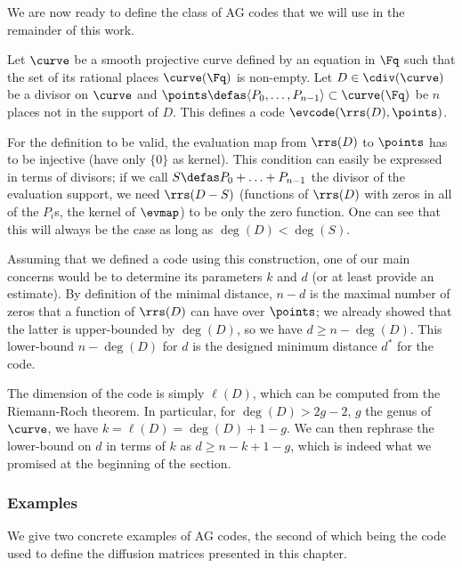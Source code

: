 We are now ready to define the class of AG codes that we will use in the remainder of this work.

Let $\curve$ be a smooth projective curve defined by an equation in $\Fq$ such that the set of its rational places $\curve(\Fq)$ is non-empty.
Let $D \in \cdiv(\curve)$ be a divisor on $\curve$ and $\points \defas \langle P_0, \ldots, P_{n-1}\rangle \subset \curve(\Fq)$ be $n$ places not in the support of $D$.
This defines a code $\evcode(\rrs(D), \points)$.

For the definition to be valid, the evaluation map from $\rrs(D)$ to $\points$ has to be injective (\ie have only $\{0\}$ as kernel).
This condition can easily be expressed in terms of divisors; if we call $S \defas P_0 + \ldots + P_{n-1}$ the divisor of the
evaluation support, we need $\rrs(D - S)$ (\ie functions of $\rrs(D)$ with zeros in all of the $P_i$s, \ie the kernel of $\evmap$) to be only the zero function.
One can see that this will always be the case as long as $\deg(D) < \deg(S)$.

\medskip

Assuming that we defined a code using this construction, one of our main concerns would be to determine its parameters $k$ and $d$ (or at least provide an estimate).
By definition of the minimal distance, $n - d$ is the maximal number of zeros that a function of $\rrs(D)$ can have
over $\points$; we already showed that the latter is upper-bounded by $\deg(D)$, so we have $d \geq n - \deg(D)$. This lower-bound
$n - \deg(D)$ for $d$ is the designed minimum distance $d^*$ for the code.

The dimension of the code is simply $\ell(D)$, which can be computed from the Riemann-Roch theorem. In particular, for $\deg(D) > 2g -2$, $g$ the genus of
$\curve$, we have $k = \ell(D) = \deg(D) + 1 - g$. We can then rephrase the lower-bound on $d$ in terms of $k$ as $d \geq n - k + 1 - g$, which is indeed
what we promised at the beginning of the section.

\subsubsection{Examples}

We give two concrete examples of AG codes, the second of which being the code used to define the diffusion matrices presented in this chapter.

